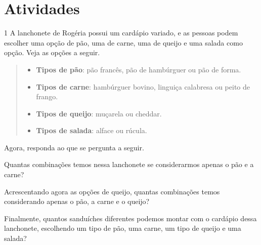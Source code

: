 \section*{Atividades}

\num{1} A lanchonete de Rogéria possui um cardápio variado, e as pessoas podem
escolher uma opção de pão, uma de carne, uma de queijo e uma salada como opção.
Veja as opções a seguir.

\begin{quote}
\begin{itemize}
  \item \textbf{Tipos de pão}: pão francês, pão de hambúrguer ou pão de forma.
  \item \textbf{Tipos de carne}: hambúrguer bovino, linguiça calabresa ou peito de frango.
  \item \textbf{Tipos de queijo}: muçarela ou cheddar.
  \item \textbf{Tipos de salada}: alface ou rúcula.
\end{itemize}
\end{quote}

Agora, responda ao que se pergunta a seguir.

\begin{escolha}
\item
  Quantas combinações temos nessa lanchonete se considerarmos apenas o
  pão e a carne?

\begin{mdframed}[linewidth=2pt,linecolor=salmao,roundcorner=2pt]
\vspace{1cm}
\end{mdframed}

\item
  Acrescentando agora as opções de queijo, quantas combinações temos
  considerando apenas o pão, a carne e o queijo?

\begin{mdframed}[linewidth=2pt,linecolor=salmao,roundcorner=2pt]
\vspace{1cm}
\end{mdframed}

\item
  Finalmente, quantos sanduíches diferentes podemos montar com o
  cardápio dessa lanchonete, escolhendo um tipo de pão, uma carne, um tipo de queijo e uma
  salada?

\begin{mdframed}[linewidth=2pt,linecolor=salmao,roundcorner=2pt]
\vspace{1cm}
\end{mdframed}

\end{escolha}

